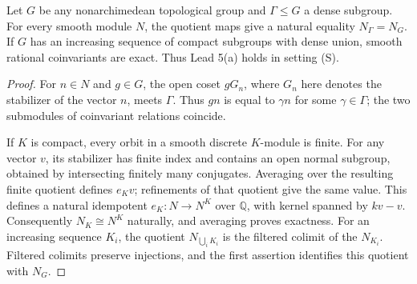 \begin{proposition}
\label{A:averaging}
Let $G$ be any nonarchimedean topological group and $\Gamma\leq G$ a
dense subgroup. For every smooth module $N$, the quotient maps give a
natural equality $N_\Gamma=N_G$. If $G$ has an increasing sequence of
compact subgroups with dense union, smooth rational coinvariants are
exact. Thus Lead 5(a) holds in setting (S).
\end{proposition}
\begin{proof}
For $n\in N$ and $g\in G$, the open coset $gG_n$, where $G_n$ here
denotes the stabilizer of the vector $n$, meets $\Gamma$. Thus $gn$ is
equal to $\gamma n$ for some $\gamma\in\Gamma$; the two submodules of
coinvariant relations coincide.

If $K$ is compact, every orbit in a smooth discrete $K$-module is
finite. For any vector $v$, its stabilizer has finite index and contains
an open normal subgroup, obtained by intersecting finitely many
conjugates. Averaging over the resulting finite quotient defines
$e_Kv$; refinements of that quotient give the same value. This defines
a natural idempotent $e_K:N\to N^K$ over $\mathbb Q$, with kernel
spanned by $kv-v$. Consequently $N_K\cong N^K$ naturally, and averaging
proves exactness. For an increasing sequence $K_i$, the quotient
$N_{\bigcup_iK_i}$ is the filtered colimit of the $N_{K_i}$. Filtered
colimits preserve injections, and the first assertion identifies this
quotient with $N_G$.
\end{proof}

